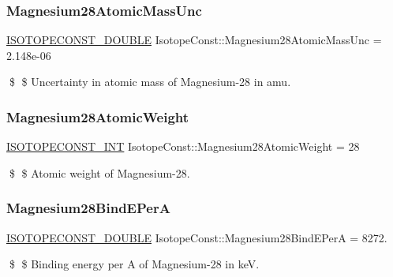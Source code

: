 \subsubsection{\texorpdfstring{Magnesium28\+Atomic\+Mass\+Unc}{Magnesium28AtomicMassUnc}}
{\footnotesize\ttfamily \mbox{\hyperlink{group___isotope_const-_macros_ga8f45a7272ce02c0b4c65c44636ed719a}{I\+S\+O\+T\+O\+P\+E\+C\+O\+N\+S\+T\+\_\+\+D\+O\+U\+B\+LE}} Isotope\+Const\+::\+Magnesium28\+Atomic\+Mass\+Unc = 2.\+148e-\/06}

\$ \$ Uncertainty in atomic mass of Magnesium-\/28 in amu. \mbox{\label{group___isotope_const-_magnesium-_mg28_ga0a10f8888a60452e5165047986ed619e}} 
\subsubsection{\texorpdfstring{Magnesium28\+Atomic\+Weight}{Magnesium28AtomicWeight}}
{\footnotesize\ttfamily \mbox{\hyperlink{group___isotope_const-_macros_ga5f18360b3e99483a35c32d789e62621c}{I\+S\+O\+T\+O\+P\+E\+C\+O\+N\+S\+T\+\_\+\+I\+NT}} Isotope\+Const\+::\+Magnesium28\+Atomic\+Weight = 28}

\$ \$ Atomic weight of Magnesium-\/28. \mbox{\label{group___isotope_const-_magnesium-_mg28_ga6bad78e67a930e99a5f02cf73a7bddf1}} 
\subsubsection{\texorpdfstring{Magnesium28\+Bind\+E\+PerA}{Magnesium28BindEPerA}}
{\footnotesize\ttfamily \mbox{\hyperlink{group___isotope_const-_macros_ga8f45a7272ce02c0b4c65c44636ed719a}{I\+S\+O\+T\+O\+P\+E\+C\+O\+N\+S\+T\+\_\+\+D\+O\+U\+B\+LE}} Isotope\+Const\+::\+Magnesium28\+Bind\+E\+PerA = 8272.}

\$ \$ Binding energy per A of Magnesium-\/28 in keV. \mbox{\label{group___isotope_const-_magnesium-_mg28_ga9b21d13f8b5e2637c6a1d475082bc071}} 
